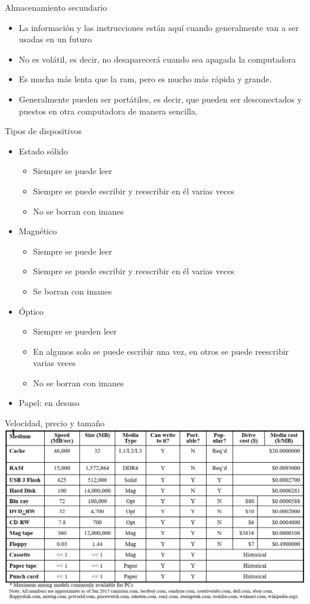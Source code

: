 \documentclass[11pt]{beamer}
\begin{document}
		\begin{frame}{Almacenamiento secundario}
			\begin{itemize}
				\item La información y las instrucciones están aquí cuando generalmente van a ser usadas en un futuro
				\item No es volátil, es decir, no desaparecerá cuando sea apagada la computadora
				\item Es mucha más lenta que la ram, pero es mucho más rápida y grande.
				\item Generalmente pueden ser portátiles, es decir, que pueden ser desconectados y puestos en otra computadora de manera sencilla.
			\end{itemize}
		\end{frame}
		\begin{frame}{Tipos de dispositivos}
			\begin{itemize}
				\item Estado sólido
				\begin{itemize}
					\item Siempre se puede leer
					\item Siempre se puede escribir y reescribir en él varias veces
					\item No se borran con imanes
				\end{itemize}
				\item Magnético
				\begin{itemize}
					\item Siempre se puede leer
					\item Siempre se puede escribir y reescribir en él varias veces
					\item Se borran con imanes
				\end{itemize}
				\item Óptico
				\begin{itemize}
					\item Siempre se pueden leer
					\item En algunos solo se puede escribir una vez, en otros se puede reescribir varias veces
					\item No se borran con imanes
				\end{itemize}
				\item Papel: en desuso
			\end{itemize}
		\end{frame}
		\begin{frame}{Velocidad, precio y tamaño}
			\includegraphics[width=\textwidth]{precio.jpg}
		\end{frame}
\end{document}
